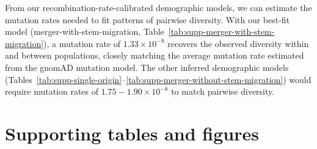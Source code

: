\documentclass[]{article}
\begin{document}
From our recombination-rate-calibrated demographic models, we can estimate the
mutation rates needed to fit patterns of pairwise diversity. With our best-fit
model (merger-with-stem-migration,
Table~\ref{tab:supp-merger-with-stem-migration}), a mutation rate of
$1.33\times10^{-8}$ recovers the observed diversity within and between
populations, closely matching the average mutation rate estimated from the
gnomAD mutation model. The other inferred demographic models
(Tables~\ref{tab:supp-single-origin}--\ref{tab:supp-merger-without-stem-migration})
would require mutation rates of $1.75-1.90\times10^{-8}$ to match pairwise
diversity.






\clearpage

\section*{Supporting tables and figures}
\end{document}
